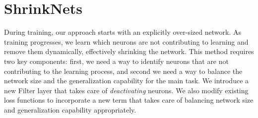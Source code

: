 \documentclass[sigconf]{acmart}
\newcommand{\srm}[1]{\textcolor{red}{{\bf Sam:} #1}}
\begin{document}
\section{ShrinkNets}

During training, our approach starts
with an explicitly over-sized network. As training progresses, we learn
which neurons are not contributing to learning and remove them
dynamically, effectively shrinking the network. This method requires two key components: first, we need a way to identify neurons that are not contributing to the
learning process, and second we need a way to balance the network size and the
generalization capability for the main task. We introduce a new \textsf{Filter} layer that takes care of \emph{deactivating} neurons. We also modify
existing loss functions to incorporate a new term that takes care of balancing
network size and generalization capability appropriately. 

%
%
%

\end{document}
